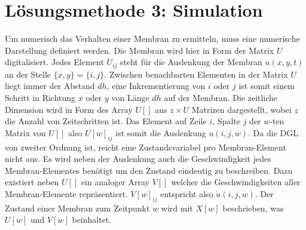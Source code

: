 %
%
%
\section{Lösungsmethode 3: Simulation 
	\label{kreismembran:section:teil4}}

Um numerisch das Verhalten einer Membran zu ermitteln, muss eine numerische Darstellung definiert werden.
Die Membran wird hier in Form der Matrix $  U $ digitalisiert.
Jedes Element  $ U_{ij} $ steht für die Auslenkung der Membran $ u(x,y,t) $ an der Stelle $ \{x,y\}=\{i,j\} $.
Zwischen benachbarten Elementen in der Matrix $ U $ liegt immer der Abstand $ dh $, eine Inkrementierung von $ i $ oder $ j $ ist somit einem Schritt in Richtung $ x $ oder $ y $ von Länge $ dh $ auf der Membran.
Die zeitliche Dimension wird in Form des Array $  U[] $ aus $ z \times U $ Matrizen dargestellt, wobei $ z $ die Anzahl von Zeitschritten ist.
Das Element auf Zeile $ i $, Spalte $ j $ der $ w $-ten Matrix von $ U[] $ also $ U[w]_{ij} $ ist somit die Auslenkung $ u(i,j,w) $.
Da die DGL von zweiter Ordnung ist, reicht eine Zustandsvariabel pro Membran-Element nicht aus. 
Es wird neben der Auslenkung auch die Geschwindigkeit jedes Membran-Elementes benötigt um den Zustand eindeutig zu beschreiben. 
Dazu existiert neben $ U[] $ ein analoger Array $ V[] $ welcher die Geschwindigkeiten aller Membran-Elemente repräsentiert. 
$ V[w]_{ij} $ entspricht also $ \dot{u}(i,j,w) $. 
Der Zustand einer Membran zum Zeitpunkt $ w $ wird mit $ X[w] $ beschrieben, was $ U[w] $ und $ V[w] $ beinhaltet.

